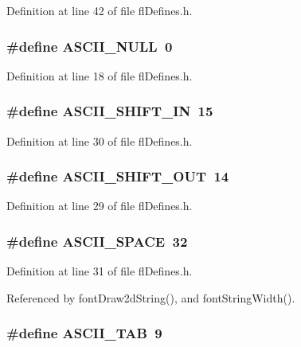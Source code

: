 Definition at line 42 of file fl\-Defines.h.
\subsubsection{\setlength{\rightskip}{0pt plus 5cm}\#define ASCII\_\-NULL~0}\label{flDefines_8h_0a12d2e8706f5d39ab82bd43044efc20}




Definition at line 18 of file fl\-Defines.h.
\subsubsection{\setlength{\rightskip}{0pt plus 5cm}\#define ASCII\_\-SHIFT\_\-IN~15}\label{flDefines_8h_2e57874e2c893c09934fcba6187a6732}




Definition at line 30 of file fl\-Defines.h.
\subsubsection{\setlength{\rightskip}{0pt plus 5cm}\#define ASCII\_\-SHIFT\_\-OUT~14}\label{flDefines_8h_f15b77c88b88d362ad35d89e1513f207}




Definition at line 29 of file fl\-Defines.h.
\subsubsection{\setlength{\rightskip}{0pt plus 5cm}\#define ASCII\_\-SPACE~32}\label{flDefines_8h_7b42baa421e0d53aa73e093326d3d033}




Definition at line 31 of file fl\-Defines.h.

Referenced by font\-Draw2d\-String(), and font\-String\-Width().
\subsubsection{\setlength{\rightskip}{0pt plus 5cm}\#define ASCII\_\-TAB~9}\label{flDefines_8h_bcd3d8c3082acbb105816e2274d1fb2f}




